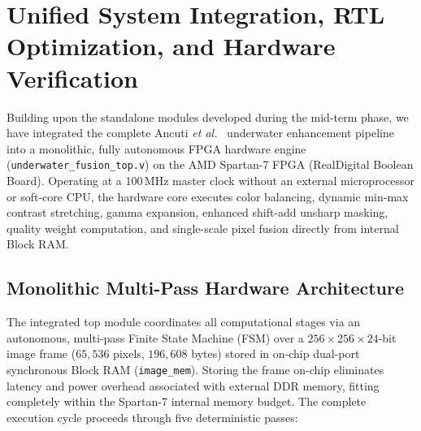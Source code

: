 \documentclass[10pt,twocolumn,letterpaper]{article}
\begin{document}

{\color{updateblue}

\section{Unified System Integration, RTL Optimization, and Hardware Verification}
\label{sec:final_system_integration}

Building upon the standalone modules developed during the mid-term phase, we have integrated the complete Ancuti \emph{et al.}~\cite{ancuti2018color} underwater enhancement pipeline into a monolithic, fully autonomous FPGA hardware engine (\texttt{underwater\_fusion\_top.v}) on the AMD Spartan-7 FPGA (RealDigital Boolean Board). Operating at a 100\,MHz master clock without an external microprocessor or soft-core CPU, the hardware core executes color balancing, dynamic min-max contrast stretching, gamma expansion, enhanced shift-add unsharp masking, quality weight computation, and single-scale pixel fusion directly from internal Block RAM.

\subsection{Monolithic Multi-Pass Hardware Architecture}
\label{subsec:multipass_fsm}

The integrated top module coordinates all computational stages via an autonomous, multi-pass Finite State Machine (FSM) over a $256\times256\times24$-bit image frame ($65,536$ pixels, $196,608$ bytes) stored in on-chip dual-port synchronous Block RAM (\texttt{image\_mem}). Storing the frame on-chip eliminates latency and power overhead associated with external DDR memory, fitting completely within the Spartan-7 internal memory budget. The complete execution cycle proceeds through five deterministic passes:

}
\end{document}
